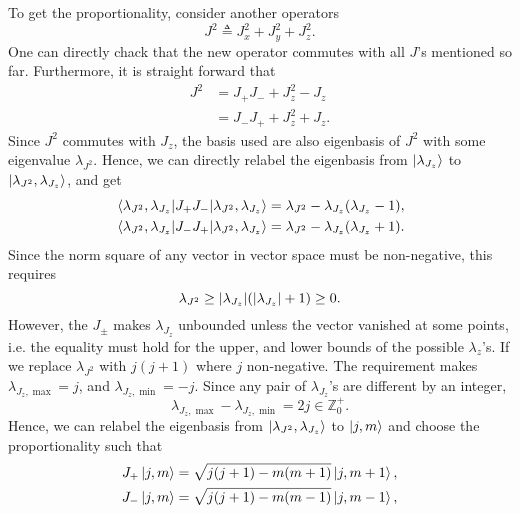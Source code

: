 \documentclass[preprint, 12pt]{revtex4-2}
\numberwithin{equation}{section}
\begin{document}
To get the proportionality, consider another operators
\begin{equation}\label{eq:J^2}
    J^2 \triangleq J_x^2 + J_y^2+J_z^2.
\end{equation}
One can directly chack that the new operator commutes with all $J$'s mentioned so far. Furthermore, it is straight forward that
\begin{equation}\label{eq:J^2 identity}
    \begin{aligned}
        J^2 &= J_+J_- + J_z^2 - J_z \\
        &= J_-J_+ + J_z^2 + J_z.
    \end{aligned}
\end{equation}
Since $J^2$ commutes with $J_z$, the basis used are also eigenbasis of $J^2$ with some eigenvalue $\lambda_{J^2}$. Hence, we can directly relabel the eigenbasis from $\ket{\lambda_{J_z}}$ to $\ket{\lambda_{J^2}, \lambda_{J_z}}$, and get
\begin{equation}\label{eq:ladder norm square}
    \begin{aligned}
        \mel{\lambda_{J^2}, \lambda_{J_z}}{J_+J_-}{\lambda_{J^2}, \lambda_{J_z}} &= \lambda_{J^2} - \lambda_{J_z}(\lambda_{J_z} - 1), \\
        \mel{\lambda_{J^2}, \lambda_{J_z}}{J_-J_+}{\lambda_{J^2}, \lambda_{J_z}} &= \lambda_{J^2} - \lambda_{J_z}(\lambda_{J_z} + 1).
    \end{aligned}
\end{equation}
Since the norm square of any vector in vector space must be non-negative, this requires
\begin{equation}\label{eq:eigenvalues' condition}
    \lambda_{J^2} \geq \abs{\lambda_{J_z}}(\abs{\lambda_{J_z}}+1) \geq 0.
\end{equation}
However, the $J_\pm$ makes $\lambda_{J_z}$ unbounded unless the vector vanished at some points, i.e. the equality must hold for the upper, and lower bounds of the possible $\lambda_z$'s. If we replace $\lambda_{J^2}$ with $j(j+1)$ where $j$ non-negative. The requirement makes $\lambda_{J_z, \max} = j$, and $\lambda_{J_z, \min} = -j$. Since any pair of $\lambda_{J_z}$'s are different by an integer, 
\begin{equation}\label{eq:eigenvalues' requirement}
    \lambda_{J_z, \max} - \lambda_{J_z, \min} = 2j \in \mathbb{Z}_0^+.
\end{equation}
Hence, we can relabel the eigenbasis from $\ket{\lambda_{J^2}, \lambda_{J_z}}$ to $\ket{j, m}$ and choose the proportionality such that
\begin{equation} \label{eq:J ladder}
    \begin{aligned}
        J_+\ket{j, m} &= \sqrt{j(j+1) - m(m + 1)}\ket{j, m+1}, \\
        J_-\ket{j, m} &= \sqrt{j(j+1) - m(m - 1)}\ket{j, m-1},
    \end{aligned}
\end{equation}
\end{document}
